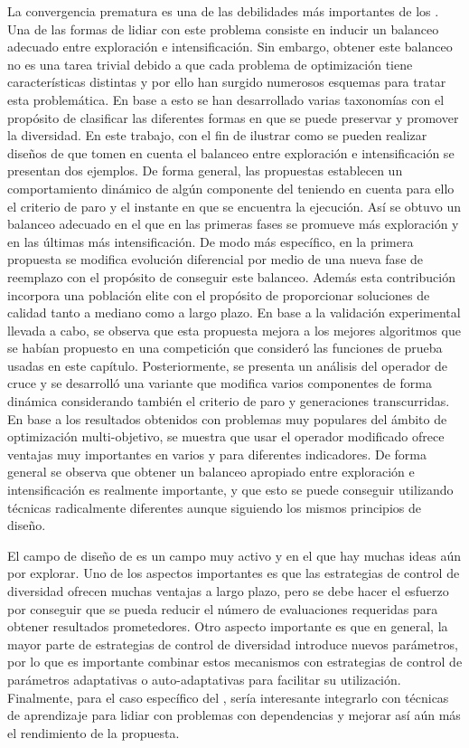 La convergencia prematura es una de las debilidades más importantes de los \EAS{}.
%
Una de las formas de lidiar con este problema consiste en inducir un balanceo adecuado entre exploración e intensificación.
%
Sin embargo, obtener este balanceo no es una tarea trivial debido a que cada problema de optimización tiene características distintas y por
ello han surgido numerosos esquemas para tratar esta problemática.
%
En base a esto se han desarrollado varias taxonomías con el propósito de clasificar las diferentes formas en que se puede preservar y promover la diversidad.
%
En este trabajo, con el fin de ilustrar como se pueden realizar diseños de \EAS{} que tomen en cuenta el balanceo entre exploración e intensificación
se presentan dos ejemplos.
%
De forma general, las propuestas establecen un comportamiento dinámico de algún componente del \EA{} teniendo en cuenta para ello el criterio de paro 
y el instante en que se encuentra la ejecución.
%
Así se obtuvo un balanceo adecuado en el que en las primeras fases se promueve más exploración y en las últimas más intensificación. 
%
De modo más específico, en la primera propuesta se modifica evolución diferencial por medio de una nueva fase de reemplazo con el propósito de conseguir este balanceo. 
%
Además esta contribución incorpora una población elite con el propósito de proporcionar soluciones de calidad tanto a mediano como a largo plazo.
%
En base a la validación experimental llevada a cabo, se observa que esta propuesta mejora a los mejores algoritmos que se habían propuesto en una competición
que consideró las funciones de prueba usadas en este capítulo.
%
Posteriormente, se presenta un análisis del operador de cruce \SBX{} y se desarrolló una variante que modifica varios componentes de forma dinámica
considerando también el criterio de paro y generaciones transcurridas. 
%
En base a los resultados obtenidos con problemas muy populares del ámbito de optimización multi-objetivo, se muestra que usar el operador \SBX{} modificado ofrece ventajas muy importantes
en varios \MOEAS{} y para diferentes indicadores.
%
De forma general se observa que obtener un balanceo apropiado entre exploración e intensificación es realmente importante, y que
esto se puede conseguir utilizando técnicas radicalmente diferentes aunque siguiendo los mismos principios de diseño.

El campo de diseño de \EAS{} es un campo muy activo y en el que hay muchas ideas aún por explorar.
%
Uno de los aspectos importantes es que las estrategias de control de diversidad ofrecen muchas ventajas a largo plazo, 
pero se debe hacer el esfuerzo por conseguir que se pueda reducir el número de evaluaciones requeridas para obtener 
resultados prometedores.
%
Otro aspecto importante es que en general, la mayor parte de estrategias de control de diversidad introduce nuevos parámetros, por lo que es importante
combinar estos mecanismos con estrategias de control de parámetros adaptativas o auto-adaptativas para facilitar su utilización.
%
Finalmente, para el caso específico del \DSBX{}, sería interesante integrarlo con técnicas de aprendizaje para lidiar con problemas con dependencias y mejorar
así aún más el rendimiento de la propuesta.
